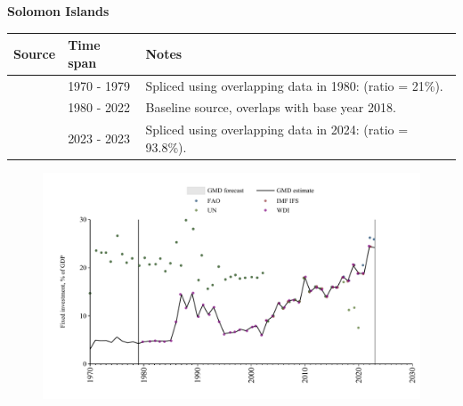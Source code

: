 \documentclass[12pt,a4paper,landscape]{article}
\begin{document}
\begin{adjustbox}{max totalsize={\paperwidth}{\paperheight},center}
\begin{minipage}[t][\textheight][t]{\textwidth}
\vspace*{0.5cm}
{}
\begin{center}
{\Large\bfseries Solomon Islands}
\end{center}
\vspace{0.5cm}
\begin{table}[H]
\centering
\small
\begin{tabular}{|l|l|l|}
\hline
\textbf{Source} & \textbf{Time span} & \textbf{Notes} \\
\hline
\rowcolor{white}\cite{UN}& 1970 - 1979 &Spliced using overlapping data in 1980: (ratio = 21\%).\\
\rowcolor{lightgray}\cite{WDI}& 1980 - 2022 &Baseline source, overlaps with base year 2018.\\
\rowcolor{white}\cite{FAO}& 2023 - 2023 &Spliced using overlapping data in 2024: (ratio = 93.8\%).\\
\hline
\end{tabular}
\end{table}
\begin{figure}[H]
\centering
\includegraphics[width=\textwidth,height=0.6\textheight,keepaspectratio]{graphs/SLB_finv_GDP.pdf}
\end{figure}
\end{minipage}
\end{adjustbox}
\end{document}
